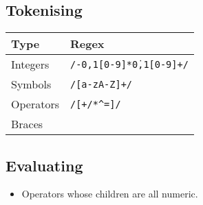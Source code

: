         \subsection*{Tokenising}
            \begin{tabular}{p{} | p{}}
                Type & Regex\footnotemark{} \\\hline
                Integers & \texttt{/-{0,1}[0-9]*\.{0,1}[0-9]+/} \\
                Symbols & \texttt{/[a-zA-Z]+/} \\
                Operators & \texttt{/[+\-/*^=]/} \\
                Braces &  \\
            \end{tabular}

        \subsection*{Evaluating}
            \begin{itemize}
                \item Operators whose children are all numeric.
            \end{itemize}

